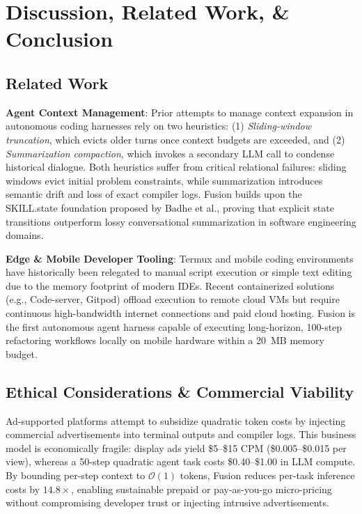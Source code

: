\section{Discussion, Related Work, \& Conclusion}
\label{sec:conclusion}

\subsection{Related Work}
\noindent\textbf{Agent Context Management}:
Prior attempts to manage context expansion in autonomous coding harnesses rely on two heuristics: (1) \emph{Sliding-window truncation}, which evicts older turns once context budgets are exceeded, and (2) \emph{Summarization compaction}, which invokes a secondary LLM call to condense historical dialogue. Both heuristics suffer from critical relational failures: sliding windows evict initial problem constraints, while summarization introduces semantic drift and loss of exact compiler logs. Fusion builds upon the SKILL.state foundation proposed by Badhe et al., proving that explicit state transitions outperform lossy conversational summarization in software engineering domains.

\noindent\textbf{Edge & Mobile Developer Tooling}:
Termux and mobile coding environments have historically been relegated to manual script execution or simple text editing due to the memory footprint of modern IDEs. Recent containerized solutions (e.g., Code-server, Gitpod) offload execution to remote cloud VMs but require continuous high-bandwidth internet connections and paid cloud hosting. Fusion is the first autonomous agent harness capable of executing long-horizon, 100-step refactoring workflows locally on mobile hardware within a 20~MB memory budget.

\subsection{Ethical Considerations \& Commercial Viability}
Ad-supported platforms attempt to subsidize quadratic token costs by injecting commercial advertisements into terminal outputs and compiler logs. This business model is economically fragile: display ads yield \$5--\$15 CPM (\$0.005--\$0.015 per view), whereas a 50-step quadratic agent task costs \$0.40--\$1.00 in LLM compute. By bounding per-step context to $\mathcal{O}(1)$ tokens, Fusion reduces per-task inference costs by $14.8\times$, enabling sustainable prepaid or pay-as-you-go micro-pricing without compromising developer trust or injecting intrusive advertisements.
